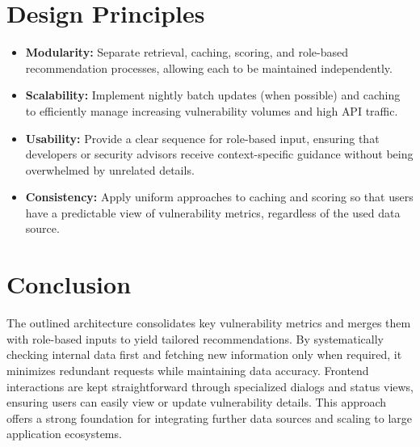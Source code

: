 \section{Design Principles}
\label{sec:design-principles}

\begin{itemize}
    \item \textbf{Modularity:} Separate retrieval, caching, scoring, and role-based recommendation processes, allowing each to be maintained independently.
    \item \textbf{Scalability:} Implement nightly batch updates (when possible) and caching to efficiently manage increasing vulnerability volumes and high \ac{API} traffic.
    \item \textbf{Usability:} Provide a clear sequence for role-based input, ensuring that developers or security advisors receive context-specific guidance without being overwhelmed by unrelated details.
    \item \textbf{Consistency:} Apply uniform approaches to caching and scoring so that users have a predictable view of vulnerability metrics, regardless of the used data source.
\end{itemize}

\section{Conclusion}
\label{sec:architecture-conclusion}
The outlined architecture consolidates key vulnerability metrics and merges them with role-based inputs to yield tailored recommendations. By systematically checking internal data first and fetching new information only when required, it minimizes redundant requests while maintaining data accuracy. Frontend interactions are kept straightforward through specialized dialogs and status views, ensuring users can easily view or update vulnerability details. This approach offers a strong foundation for integrating further data sources and scaling to large application ecosystems.